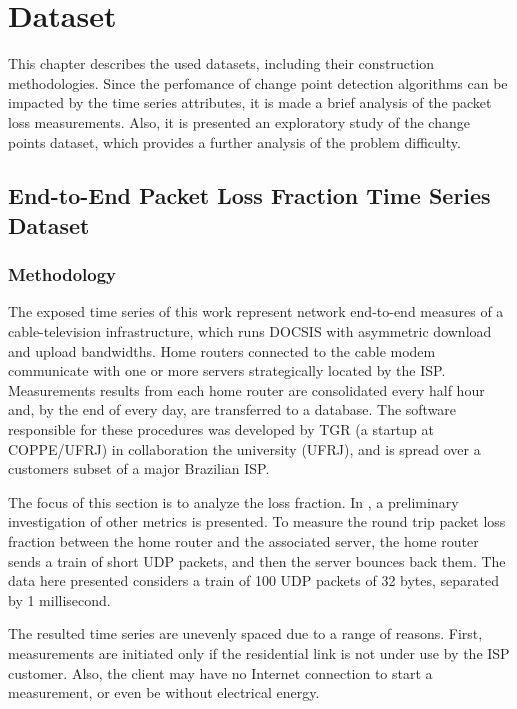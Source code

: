 \chapter{Dataset}

This chapter describes the used datasets, including their construction methodologies. Since the perfomance of change point detection algorithms can be impacted by the time series attributes, it is made a brief analysis of the packet loss measurements. Also, it is presented an exploratory study of the change points dataset, which provides a further analysis of the problem difficulty. 

\section{End-to-End Packet Loss Fraction Time Series Dataset}

\subsection{Methodology}

The exposed time series of this work represent network end-to-end measures of a cable-television infrastructure, which runs DOCSIS with asymmetric download and upload bandwidths. Home routers connected to the cable modem communicate with one or more servers strategically located by the ISP. Measurements results from each home router are consolidated every half hour and, by the end of every day, are transferred to a database. The software responsible for these procedures was developed by TGR (a startup at COPPE/UFRJ) in collaboration the university (UFRJ), and is spread over a customers subset of a major Brazilian ISP.

The focus of this section is to analyze the loss fraction. In \cite{a_preliminary_performance_measurement_study_of_residential_broadband_services_in_brazil}, a preliminary investigation of other metrics is presented. To measure the round trip packet loss fraction between the home router and the associated server, the home router sends a train of short UDP packets, and then the server bounces back them. The data here presented considers a train of 100 UDP packets of 32 bytes, separated by 1 millisecond.

The resulted time series are unevenly spaced due to a range of reasons. First, measurements are initiated only if the residential link is not under use by the ISP customer. Also, the client may have no Internet connection to start a measurement, or even be without electrical energy.

